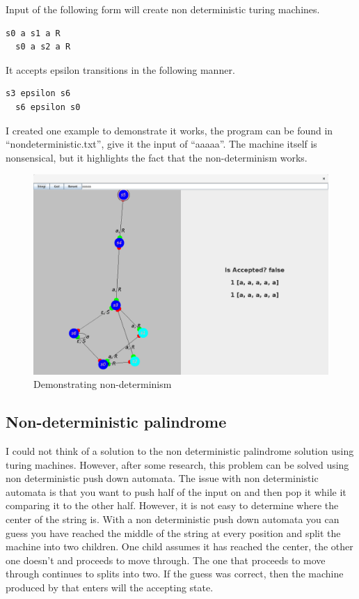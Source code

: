 \documentclass{article}
\begin{document}
Input of the following form will create non deterministic turing machines.

\begin{lstlisting}[language=bash]
  s0 a s1 a R
  s0 a s2 a R
\end{lstlisting}

It accepts epsilon transitions in the following manner.

\begin{lstlisting}[language=bash]
  s3 epsilon s6
  s6 epsilon s0
\end{lstlisting}

I created one example to demonstrate it works, the program can be found in ``nondeterministic.txt'', give it the input of ``aaaaa''. The machine itself is nonsensical, but it highlights the fact that the non-determinism works.

\begin{figure}[!htb]
  \caption{Demonstrating non-determinism}
  \centering
  \includegraphics[scale=0.13]{images/nondeterminism.png}
\end{figure}

\subsection{Non-deterministic palindrome}

I could not think of a solution to the non deterministic palindrome solution using turing machines. However, after some research, this problem can be solved using non deterministic push down automata. The issue with non deterministic automata is that you want to push half of the input on and then pop it while it comparing it to the other half. However, it is not easy to determine where the center of the string is. With a non deterministic push down automata you can guess you have reached the middle of the string at every position and split the machine into two children. One child assumes it has reached the center, the other one doesn't and proceeds to move through. The one that proceeds to move through continues to splits into two. If the guess was correct, then the machine produced by that enters will the accepting state.
\end{document}
